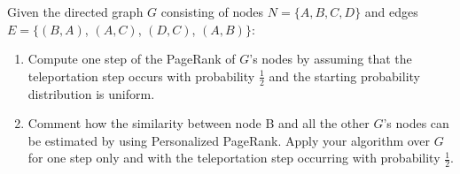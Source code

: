 \exercise

Given the directed graph $G$ consisting of nodes $N = \{ A, B, C, D \}$ and
edges $E = \{ (B, A)$, $(A, C)$, $(D, C)$, $(A, B) \}$:
%
\begin{enumerate}

  \item  Compute one step of the PageRank of $G$’s nodes by assuming that the
  teleportation step occurs with probability $\frac{1}{2}$ and the starting
  probability distribution is uniform.

  \item Comment how the similarity between node B and all the other $G$’s nodes
  can be estimated by using Personalized PageRank. Apply your algorithm over $G$
  for one step only and with the teleportation step occurring with probability
  $\frac{1}{2}$.

\end{enumerate}

\solution
%

